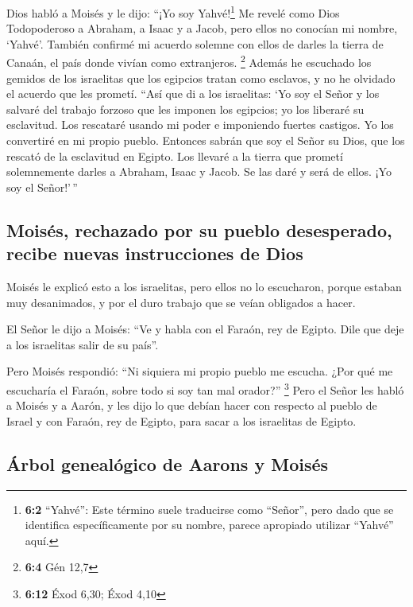  Dios habló a Moisés y le dijo: ``¡Yo soy
Yahvé!\footnote{\textbf{6:2} ``Yahvé'': Este término suele traducirse
  como ``Señor'', pero dado que se identifica específicamente por su
  nombre, parece apropiado utilizar ``Yahvé'' aquí.}  Me
revelé como Dios Todopoderoso a Abraham, a Isaac y a Jacob, pero ellos
no conocían mi nombre, `Yahvé'.  También confirmé mi
acuerdo solemne con ellos de darles la tierra de Canaán, el país donde
vivían como extranjeros. \footnote{\textbf{6:4} Gén 12,7} 
Además he escuchado los gemidos de los israelitas que los egipcios
tratan como esclavos, y no he olvidado el acuerdo que les prometí.
 ``Así que di a los israelitas: `Yo soy el Señor y los
salvaré del trabajo forzoso que les imponen los egipcios; yo los
liberaré su esclavitud. Los rescataré usando mi poder e imponiendo
fuertes castigos.  Yo los convertiré en mi propio pueblo.
Entonces sabrán que soy el Señor su Dios, que los rescató de la
esclavitud en Egipto.  Los llevaré a la tierra que prometí
solemnemente darles a Abraham, Isaac y Jacob. Se las daré y será de
ellos. ¡Yo soy el Señor!'\,''

\hypertarget{moisuxe9s-rechazado-por-su-pueblo-desesperado-recibe-nuevas-instrucciones-de-dios}{%
\subsection{Moisés, rechazado por su pueblo desesperado, recibe nuevas
instrucciones de
Dios}\label{moisuxe9s-rechazado-por-su-pueblo-desesperado-recibe-nuevas-instrucciones-de-dios}}

 Moisés le explicó esto a los israelitas, pero ellos no lo
escucharon, porque estaban muy desanimados, y por el duro trabajo que se
veían obligados a hacer.

 El Señor le dijo a Moisés:  ``Ve y habla
con el Faraón, rey de Egipto. Dile que deje a los israelitas salir de su
país''.

 Pero Moisés respondió: ``Ni siquiera mi propio pueblo me
escucha. ¿Por qué me escucharía el Faraón, sobre todo si soy tan mal
orador?'' \footnote{\textbf{6:12} Éxod 6,30; Éxod 4,10} 
Pero el Señor les habló a Moisés y a Aarón, y les dijo lo que debían
hacer con respecto al pueblo de Israel y con Faraón, rey de Egipto, para
sacar a los israelitas de Egipto.

\hypertarget{uxe1rbol-genealuxf3gico-de-aarons-y-moisuxe9s}{%
\subsection{Árbol genealógico de Aarons y
Moisés}\label{uxe1rbol-genealuxf3gico-de-aarons-y-moisuxe9s}}

